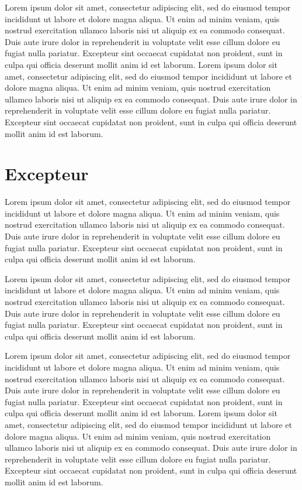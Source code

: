   Lorem ipsum dolor sit amet, consectetur adipiscing elit, sed do eiusmod tempor
  incididunt ut labore et dolore magna aliqua. Ut enim ad minim veniam, quis
  nostrud exercitation ullamco laboris nisi ut aliquip ex ea commodo consequat.
  Duis aute irure dolor in reprehenderit in voluptate velit esse cillum dolore eu
  fugiat nulla pariatur. Excepteur sint occaecat cupidatat non proident, sunt in
  culpa qui officia deserunt mollit anim id est laborum.
  Lorem ipsum dolor sit amet, consectetur adipiscing elit, sed do eiusmod tempor
  incididunt ut labore et dolore magna aliqua. Ut enim ad minim veniam, quis
  nostrud exercitation ullamco laboris nisi ut aliquip ex ea commodo consequat.
  Duis aute irure dolor in reprehenderit in voluptate velit esse cillum dolore eu
  fugiat nulla pariatur. Excepteur sint occaecat cupidatat non proident, sunt in
  culpa qui officia deserunt mollit anim id est laborum.

\section{Excepteur}
  Lorem ipsum dolor sit amet, consectetur adipiscing elit, sed do eiusmod tempor
  incididunt ut labore et dolore magna aliqua. Ut enim ad minim veniam, quis
  nostrud exercitation ullamco laboris nisi ut aliquip ex ea commodo consequat.
  Duis aute irure dolor in reprehenderit in voluptate velit esse cillum dolore eu
  fugiat nulla pariatur. Excepteur sint occaecat cupidatat non proident, sunt in
  culpa qui officia deserunt mollit anim id est laborum.

  Lorem ipsum dolor sit amet, consectetur adipiscing elit, sed do eiusmod tempor
  incididunt ut labore et dolore magna aliqua. Ut enim ad minim veniam, quis
  nostrud exercitation ullamco laboris nisi ut aliquip ex ea commodo consequat.
  Duis aute irure dolor in reprehenderit in voluptate velit esse cillum dolore eu
  fugiat nulla pariatur. Excepteur sint occaecat cupidatat non proident, sunt in
  culpa qui officia deserunt mollit anim id est laborum.

  Lorem ipsum dolor sit amet, consectetur adipiscing elit, sed do eiusmod tempor
  incididunt ut labore et dolore magna aliqua. Ut enim ad minim veniam, quis
  nostrud exercitation ullamco laboris nisi ut aliquip ex ea commodo consequat.
  Duis aute irure dolor in reprehenderit in voluptate velit esse cillum dolore eu
  fugiat nulla pariatur. Excepteur sint occaecat cupidatat non proident, sunt in
  culpa qui officia deserunt mollit anim id est laborum.
  Lorem ipsum dolor sit amet, consectetur adipiscing elit, sed do eiusmod tempor
  incididunt ut labore et dolore magna aliqua. Ut enim ad minim veniam, quis
  nostrud exercitation ullamco laboris nisi ut aliquip ex ea commodo consequat.
  Duis aute irure dolor in reprehenderit in voluptate velit esse cillum dolore eu
  fugiat nulla pariatur. Excepteur sint occaecat cupidatat non proident, sunt in
  culpa qui officia deserunt mollit anim id est laborum.
